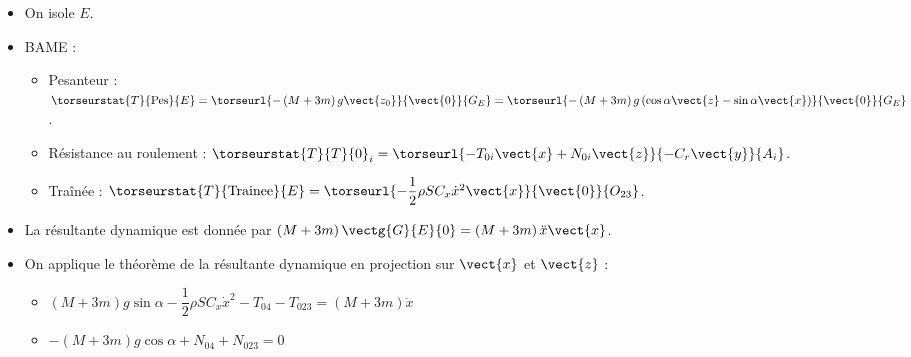 \ifprof
\begin{corrige}
\begin{itemize}
\item On isole $E$.
\item BAME : 
\begin{itemize}
\item Pesanteur : $\torseurstat{T}{\text{Pes}}{E}=\torseurl{-\left(M+3m\right)g\vect{z_0}}{\vect{0}}{G_E}=\torseurl{-\left(M+3m\right)g\left( \cos \alpha \vect{z}-\sin \alpha \vect{x} \right)}{\vect{0}}{G_E}$.
\item Résistance au roulement : $\torseurstat{T}{T}{0}_i=\torseurl{-T_{0i}\vect{x}+N_{0i}\vect{z}}{-C_r\vect{y}}{A_i}$.
\item Traînée : $\torseurstat{T}{\text{Trainee}}{E}=\torseurl{-\dfrac{1}{2}\rho S C_x \dot{x}^2 \vect{x}}{\vect{0}}{O_{23}}$.
\end{itemize}
\item La résultante dynamique est donnée par $\left(M+3m\right)\vectg{G}{E}{0}=\left(M+3m\right)\ddot{x}\vect{x}$.
\item On applique le théorème de la résultante dynamique en projection sur $\vect{x}$ et $\vect{z}$ : 
\begin{itemize}
\item $\left(M+3m\right)g\sin \alpha -\dfrac{1}{2}\rho S C_x \dot{x}^2-T_{04}-T_{023}=\left(M+3m\right)\ddot{x}$
\item $-\left(M+3m\right)g \cos \alpha +N_{04}+N_{023}=0$
\end{itemize}
\end{itemize}
\end{corrige}
\else
\fi

